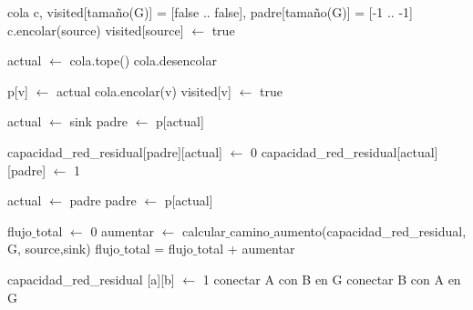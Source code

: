 \begin{algorithmic}
	\State cola c, visited[tamaño(G)] = [false .. false], padre[tamaño(G)] = [-1 .. -1]
	\State c.encolar(source)
	\State visited[source] $\leftarrow$ true

		\State actual $\leftarrow$ cola.tope()
		\State cola.desencolar
		
		 
					\State p[v] $\leftarrow$ actual
					\State cola.encolar(v)
					\State visited[v] $\leftarrow$ true
				\EndIf
		\EndFor 
	\EndWhile

		\State {} 
	\EndIf

	\State actual $\leftarrow$ sink
	\State padre $\leftarrow$ p[actual]
	
		\State capacidad_red_residual[padre][actual] $\leftarrow$ 0
		\State capacidad_red_residual[actual][padre] $\leftarrow$ 1
		
		\State actual $\leftarrow$ padre
		\State padre $\leftarrow$ p[actual]
	\EndWhile

	\State {} 
\EndFunction
\end{algorithmic}
\hspace{1cm}

\begin{algorithmic}
	\State flujo$\_$total $\leftarrow$ 0
	\Repeat 
			\State aumentar $\leftarrow$ calcular$\_$camino$\_$aumento(capacidad_red_residual, G, source,sink)
			\State flujo$\_$total = flujo$\_$total + aumentar
	
\EndFunction
\end{algorithmic}
\hspace{1cm}

\begin{algorithmic}
	\State capacidad_red_residual [a][b] $\leftarrow$ 1
	\State conectar A con B en G
	\State conectar B con A en G
\EndFunction
\end{algorithmic}
\hspace{1cm}

